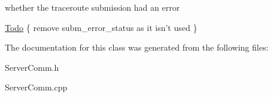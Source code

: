 whether the traceroute submission had an error\begin{Desc}
\item[\hyperlink{todo__todo000002}{Todo}]\{ remove subm\_\-error\_\-status as it isn't used \} \end{Desc}


The documentation for this class was generated from the following files:\begin{CompactItemize}
\item 
ServerComm.h\item 
ServerComm.cpp\end{CompactItemize}
